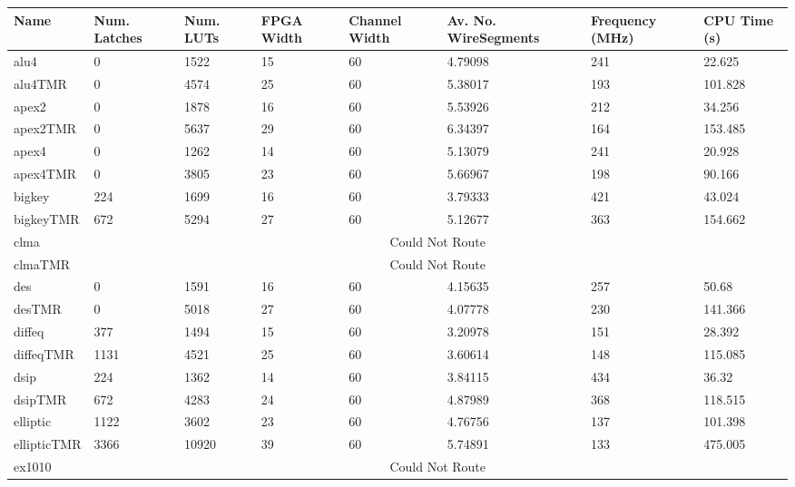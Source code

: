 \documentclass[12pt,final,oneside]{dwThesis} %
\begin{document}
   \begin{table}
      \footnotesize
      \begin{adjustwidth}{-1cm}{-1.2cm}
         \begin{tabularx}{1.1\textwidth}{llllp{1.5cm}p{2.2cm}p{1.5cm}X}
            \toprule
            Name & Num. Latches & Num. LUTs & FPGA Width & Channel Width & Av. No. Wire\newline Segments & Frequency (MHz) & CPU Time (s)\\\midrule
            alu4 & 0 & 1522 & 15 & 60 & 4.79098 & 241 & 22.625\\
            alu4TMR & 0 & 4574 & 25 & 60 & 5.38017 & 193 & 101.828\\\midrule
            apex2 & 0 & 1878 & 16 & 60 & 5.53926 & 212 & 34.256\\
            apex2TMR & 0 & 5637 & 29 & 60 & 6.34397 & 164 & 153.485\\\midrule
            apex4 & 0 & 1262 & 14 & 60 & 5.13079 & 241 & 20.928\\
            apex4TMR & 0 & 3805 & 23 & 60 & 5.66967 & 198 & 90.166\\\midrule
            bigkey & 224 & 1699 & 16 & 60 & 3.79333 & 421 & 43.024\\
            bigkeyTMR & 672 & 5294 & 27 & 60 & 5.12677 & 363 & 154.662\\\midrule
            clma & \multicolumn{7}{c}{Could Not Route}\\
            clmaTMR & \multicolumn{7}{c}{Could Not Route}\\\midrule
            des & 0 & 1591 & 16 & 60 & 4.15635 & 257 & 50.68\\
            desTMR & 0 & 5018 & 27 & 60 & 4.07778 & 230 & 141.366\\\midrule
            diffeq & 377 & 1494 & 15 & 60 & 3.20978 & 151 & 28.392\\
            diffeqTMR & 1131 & 4521 & 25 & 60 & 3.60614 & 148 & 115.085\\\midrule
            dsip & 224 & 1362 & 14 & 60 & 3.84115 & 434 & 36.32\\
            dsipTMR & 672 & 4283 & 24 & 60 & 4.87989 & 368 & 118.515\\\midrule
            elliptic & 1122 & 3602 & 23 & 60 & 4.76756 & 137 & 101.398\\
            ellipticTMR & 3366 & 10920 & 39 & 60 & 5.74891 & 133 & 475.005\\\midrule
            ex1010 & \multicolumn{7}{c}{Could Not Route}\\

\end{tabularx}
\end{adjustwidth}
\end{table}
\end{document}
